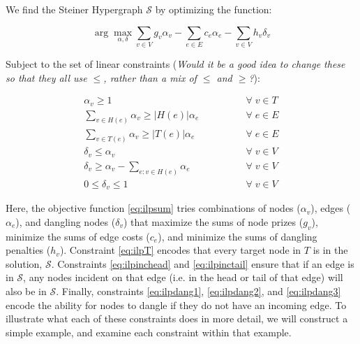 \documentclass[12pt,twoside]{reedthesis}
\theoremstyle{definition}
\newcommand{\argmax}{\arg\!\max}
\begin{document}
We find the Steiner Hypergraph $\mathcal{S}$ by optimizing the function:

\begin{equation} \label{eq:ilpsum}
 \argmax_{\alpha, \delta} \sum_{v \in V} g_v \alpha_v - \sum_{e \in E} c_e \alpha_e - \sum_{v \in V} h_v \delta_v
\end{equation}

Subject to the set of linear constraints (\emph{Would it be a good idea to change these so that they all use $\leq$, rather than a mix of $\leq$ and $\geq$?}):

\begin{align}
 \alpha_v \geq 1 \qquad\qquad &\forall\; v \in T\label{eq:ilpT}\\
 \sum_{v \in H(e)} \alpha_v \geq \lvert H(e)\rvert \alpha_e \qquad\qquad &\forall\; e \in E\label{eq:ilpinchead}\\
 \sum_{v \in T(e)} \alpha_v \geq \lvert T(e)\rvert \alpha_e\qquad\qquad &\forall\; e \in E\label{eq:ilpinctail}\\
 \delta_v \leq \alpha_v \qquad\qquad &\forall\; v \in V\label{eq:ilpdang1}\\
 \delta_v \geq \alpha_{v} - \sum_{e:v \in H(e)} \alpha_e \qquad\qquad &\forall\; v \in V\label{eq:ilpdang2}\\
0 \leq \delta_v \leq 1 \qquad\qquad &\forall\; v \in V\label{eq:ilpdang3}%
\end{align}%


Here, the objective function \eqref{eq:ilpsum} tries combinations of nodes ($\alpha_v$), edges ($\alpha_e$), and dangling nodes ($\delta_v$) that maximize the sums of node prizes ($g_v$), minimize the sums of edge costs ($c_e$), and minimize the sums of dangling penalties ($h_v$). Constraint \eqref{eq:ilpT} encodes that every target node in $T$ is in the solution, $\mathcal{S}$.  Constraints \eqref{eq:ilpinchead} and \eqref{eq:ilpinctail} ensure that if an edge is in $\mathcal{S}$, any nodes incident on that edge (i.e. in the head or tail of that edge) will also be in $\mathcal{S}$.  Finally, constraints \eqref{eq:ilpdang1}, \eqref{eq:ilpdang2}, and \eqref{eq:ilpdang3} encode the ability for nodes to dangle if they do not have an incoming edge. To illustrate what each of these constraints does in more detail, we will construct a simple example, and examine each constraint within that example.\par
\end{document}
